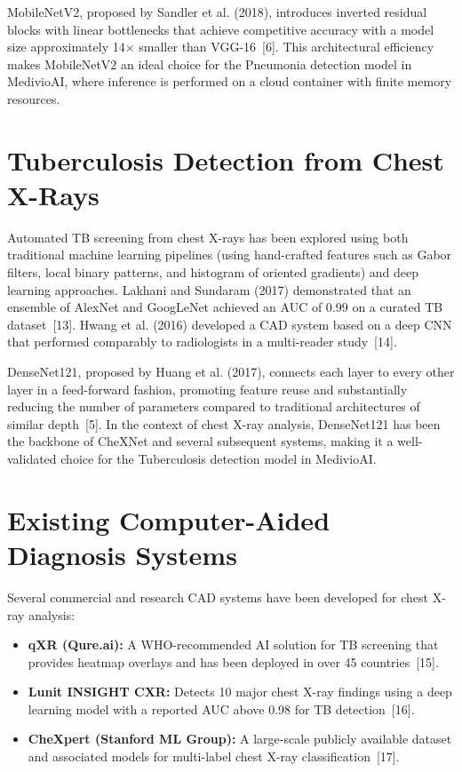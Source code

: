 \documentclass[12pt, a4paper, oneside]{report}
\begin{document}
MobileNetV2, proposed by Sandler et al. (2018), introduces inverted residual blocks with linear bottlenecks that achieve competitive accuracy with a model size approximately 14$\times$ smaller than VGG-16~[6]. This architectural efficiency makes MobileNetV2 an ideal choice for the Pneumonia detection model in MedivioAI, where inference is performed on a cloud container with finite memory resources.

\section{Tuberculosis Detection from Chest X-Rays}
\label{sec:tb_literature}

Automated TB screening from chest X-rays has been explored using both traditional machine learning pipelines (using hand-crafted features such as Gabor filters, local binary patterns, and histogram of oriented gradients) and deep learning approaches. Lakhani and Sundaram (2017) demonstrated that an ensemble of AlexNet and GoogLeNet achieved an AUC of 0.99 on a curated TB dataset~[13]. Hwang et al. (2016) developed a CAD system based on a deep CNN that performed comparably to radiologists in a multi-reader study~[14].

DenseNet121, proposed by Huang et al. (2017), connects each layer to every other layer in a feed-forward fashion, promoting feature reuse and substantially reducing the number of parameters compared to traditional architectures of similar depth~[5]. In the context of chest X-ray analysis, DenseNet121 has been the backbone of CheXNet and several subsequent systems, making it a well-validated choice for the Tuberculosis detection model in MedivioAI.

\section{Existing Computer-Aided Diagnosis Systems}
\label{sec:existing_cad}

Several commercial and research CAD systems have been developed for chest X-ray analysis:

\begin{itemize}
    \item \textbf{qXR (Qure.ai):} A WHO-recommended AI solution for TB screening that provides heatmap overlays and has been deployed in over 45 countries~[15].
    \item \textbf{Lunit INSIGHT CXR:} Detects 10 major chest X-ray findings using a deep learning model with a reported AUC above 0.98 for TB detection~[16].
    \item \textbf{CheXpert (Stanford ML Group):} A large-scale publicly available dataset and associated models for multi-label chest X-ray classification~[17].
\end{itemize}
\end{document}

